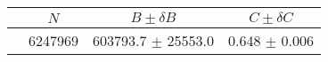 \begin{tabular}{lccc}
\hline
    &   $N$   & $B \pm \delta B$  &  $C \pm \delta C$ \\
\hline
                               & 6247969    & 603793.7   $\pm$ 25553.0 & 0.648      $\pm$ 0.006 \\
\hline
\end{tabular}
